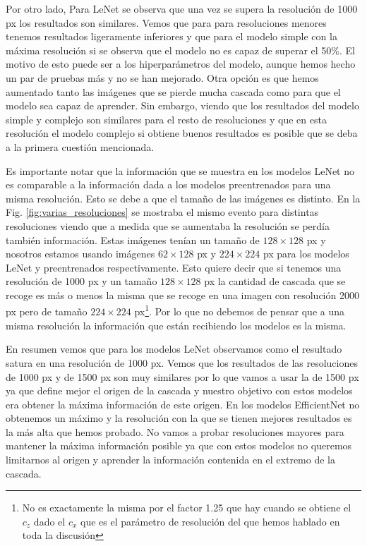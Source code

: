 \documentclass[a4paper,12pt,twoside,titlepage]{article}
\begin{document}
Por otro lado, Para LeNet se observa que una vez se supera la resolución de 1000 px los resultados son similares. Vemos que para para resoluciones menores tenemos resultados ligeramente inferiores y que para el modelo simple con la máxima resolución si se observa que el modelo no es capaz de superar el 50\%. El motivo de esto puede ser a los hiperparámetros del modelo, aunque hemos hecho un par de pruebas más y no se han mejorado. Otra opción es que hemos aumentado tanto las imágenes que se pierde mucha cascada como para que el modelo sea capaz de aprender. Sin embargo, viendo que los resultados del modelo simple y complejo son similares para el resto de resoluciones y que en esta resolución el modelo complejo si obtiene buenos resultados es posible que se deba a la primera cuestión mencionada.

Es importante notar que la información que se muestra en los modelos LeNet no es comparable a la información dada a los modelos preentrenados para una misma resolución. Esto se debe a que el tamaño de las imágenes es distinto. En la Fig. \ref{fig:varias_resoluciones} se mostraba el mismo evento para distintas resoluciones viendo que a medida que se aumentaba la resolución se perdía también información. Estas imágenes tenían un tamaño de $128\times128$ px y nosotros estamos usando imágenes $62\times128$ px y $224\times224$ px para los modelos LeNet y preentrenados respectivamente. Esto quiere decir que si tenemos una resolución de 1000 px y un tamaño $128\times128$ px la cantidad de cascada que se recoge es más o menos la misma que se recoge en una imagen con resolución 2000 px pero de tamaño $224\times224$ px\footnote{No es exactamente la misma por el factor 1.25 que hay cuando se obtiene el $c_z$ dado el $c_x$ que es el parámetro de resolución del que hemos hablado en toda la discusión}. Por lo que no debemos de pensar que a una misma resolución la información que están recibiendo los modelos es la misma.

En resumen vemos que para los modelos LeNet observamos como el resultado satura en una resolución de 1000 px. Vemos que los resultados de las resoluciones de 1000 px y de 1500 px son muy similares por lo que vamos a usar la de 1500 px ya que define mejor el origen de la cascada y nuestro objetivo con estos modelos era obtener la máxima información de este origen. En los modelos EfficientNet no obtenemos un máximo y la resolución con la que se tienen mejores resultados es la más alta que hemos probado. No vamos a probar resoluciones mayores para mantener la máxima información posible ya que con estos modelos no queremos limitarnos al origen y aprender la información contenida en el extremo de la cascada.
\end{document}
